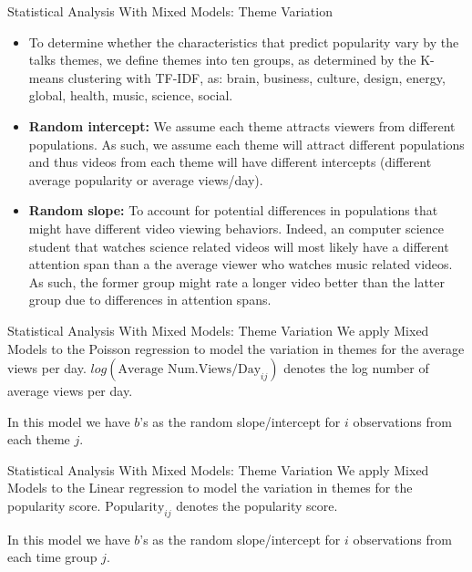 \begin{frame}{Statistical Analysis With Mixed Models: Theme Variation}
	\begin{itemize}
		\item To determine whether the characteristics that predict popularity vary by the talks themes, we define themes into ten groups, as determined by the K-means clustering with TF-IDF, as: brain, business, culture, design, energy, global, health, music, science, social. 
		\item \textbf{Random intercept: }We assume each theme attracts viewers from different populations. As such, we assume each theme will attract different populations and thus videos from each theme will have different intercepts (different average popularity or average views/day).
		\item \textbf{Random slope: }To account for potential differences in populations that might have different video viewing behaviors. Indeed, an computer science student that watches science related videos will most likely have a different attention span than a the average viewer who watches music related videos. As such, the former group might rate a longer video better than the latter group due to differences in attention spans.
	\end{itemize}
\end{frame}


\begin{frame}{Statistical Analysis With Mixed Models: Theme Variation}
We apply Mixed Models to the Poisson regression to model the variation in themes for the average views per day. $log(\text{Average Num.Views/Day}_{ij})$ denotes the log number of average views per day.

In this model we have $b$'s as the random slope/intercept for $i$ observations from each theme $j$.
\end{frame}

\begin{frame}{Statistical Analysis With Mixed Models: Theme Variation}
We apply Mixed Models to the Linear regression to model the variation in themes for the popularity score. $\text{Popularity}_{ij}$ denotes the popularity score.

In this model we have $b$'s as the random slope/intercept for $i$ observations from each time group $j$.
\end{frame}
